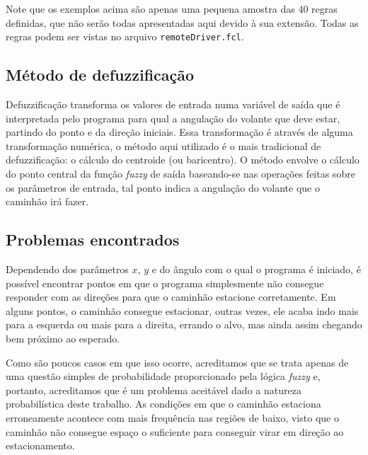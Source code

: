 \documentclass{article}
\begin{document}
        Note que os exemplos acima são apenas uma pequena amostra das 40 regras
        definidas, que não serão todas apresentadas aqui devido à sua extensão.
        Todas as regras podem ser vistas no arquivo \texttt{remoteDriver.fcl}.

    \subsection*{Método de defuzzificação}
        Defuzzificação transforma os valores de entrada numa variável de saída
        que é interpretada pelo programa para qual a angulação do volante que
        deve estar, partindo do ponto e da direção iniciais. Essa transformação
        é através de alguma transformação numérica, o método aqui utilizado é o
        mais tradicional de defuzzificação: o cálculo do centroide (ou
        baricentro). O método envolve o cálculo do ponto central da função
        \textit{fuzzy} de saída baseando-se nas operações feitas sobre os
        parâmetros de entrada, tal ponto indica a angulação do volante que o
        caminhão irá fazer.
        
    \subsection*{Problemas encontrados}
        Dependendo dos parâmetros $x$, $y$ e do ângulo com o qual o programa é
        iniciado, é possível encontrar pontos em que o programa simplesmente
        não consegue responder com as direções para que o caminhão estacione
        corretamente. Em alguns pontos, o caminhão consegue estacionar, outras
        vezes, ele acaba indo mais para a esquerda ou mais para a direita,
        errando o alvo, mas ainda assim chegando bem próximo ao esperado. 
        
        Como são poucos casos em que isso ocorre, acreditamos que se trata
        apenas de uma questão simples de probabilidade proporcionado pela
        lógica \textit{fuzzy} e, portanto, acreditamos que é um problema
        aceitável dado a natureza probabilística deste trabalho. As condições
        em que o caminhão estaciona erroneamente acontece com mais frequência
        nas regiões de baixo, visto que o caminhão não consegue espaço o
        suficiente para conseguir virar em direção ao estacionamento.
        
\end{document}
